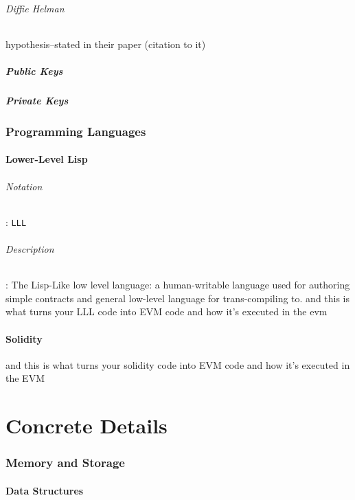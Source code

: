 \documentclass[10pt,a4paper,leqno,bibliography=totoc]{scrartcl}
\newenvironment{alphafootnotes}
{\par\edef\savedfootnotenumber{\number\value{footnote}}
\renewcommand{\thefootnote}{\alph{footnote}}
\setcounter{footnote}{0}}
{\par\setcounter{footnote}{\savedfootnotenumber}}
\begin{document}
\begin{alphafootnotes}
\begin{multicols*}{2}
				\paragraph{Diffie Helman} hypothesis--stated in their paper (citation to it)
			\subsubsection{Public Keys}

			\subsubsection{Private Keys}

	\section{Programming Languages}

		\subsection{Lower-Level Lisp}
			\paragraph{Notation}: \texttt{LLL}
			\paragraph{Description}: The Lisp-Like low level language: a human-writable language used for authoring simple contracts and general low-level language for trans-compiling to. 			and this is what turns your LLL code into EVM code and how it's executed in the evm
	
		\subsection{Solidity}
			and this is what turns your solidity code into EVM code and how it's executed in the EVM

\clearpage
\part{Concrete Details}

	\section{Memory and Storage}
			
		\subsection{Data Structures}


\end{multicols*}
\end{alphafootnotes}
\end{document}
